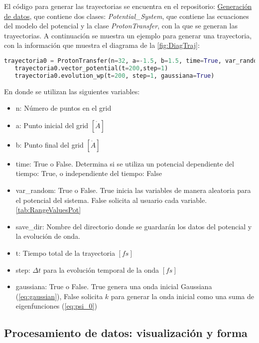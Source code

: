  El código para generar las trayectorias se encuentra en el repositorio: \href{https://github.com/Jessi-MM/PropagatorLearning/blob/main/src/Proton_Transfer_DataGenerate.ipynb}{\faGithub Generación de datos}, que contiene dos clases: \emph{Potential\_System}, que contiene las ecuaciones del modelo del potencial y la clase \emph{ProtonTransfer}, con la que se generan las trayectorias. A continuación se muestra un ejemplo para generar una trayectoria, con la información que muestra el diagrama de la \autoref{fig:DiagTraj}:

 \begin{lstlisting}[language=Python, morekeywords={ProtonTransfer, True, False}]
   trayectoria0 = ProtonTransfer(n=32, a=-1.5, b=1.5, time=True, var_random=True, save_dir='data0')
   trayectoria0.vector_potential(t=200,step=1)
   trayectoria0.evolution_wp(t=200, step=1, gaussiana=True)\end{lstlisting}

En donde se utilizan las siguientes variables:
\begin{itemize}[label=\textcolor{CTtitle}{\textbullet}]
\item n: Número de puntos en el grid
\item a: Punto inicial del grid $[\mathring{A}]$
\item b: Punto final del grid $[\mathring{A}]$
\item time: True o False. Determina si se utiliza un potencial dependiente del tiempo: True, o independiente del tiempo: False  
\item var\_random: True o False. True inicia las variables de manera aleatoria para el potencial del sistema. False solicita al usuario cada variable. \autoref{tab:RangeValuesPot}
\item save\_dir: Nombre del directorio donde se guardarán los datos del potencial y la evolución de onda.
\item t: Tiempo total de la trayectoria $[fs]$
\item step: $\Delta t$ para la evolución temporal de la onda $[fs]$
\item gaussiana: True o False. True genera una onda inicial Gaussiana (\autoref{eq:gaussian}), False solicita $k$ para generar la onda inicial como una suma de eigenfunciones (\autoref{eq:psi_0}) 
\end{itemize}

\subsection{Procesamiento de datos: visualización y forma}\label{sec:6.4.2}

